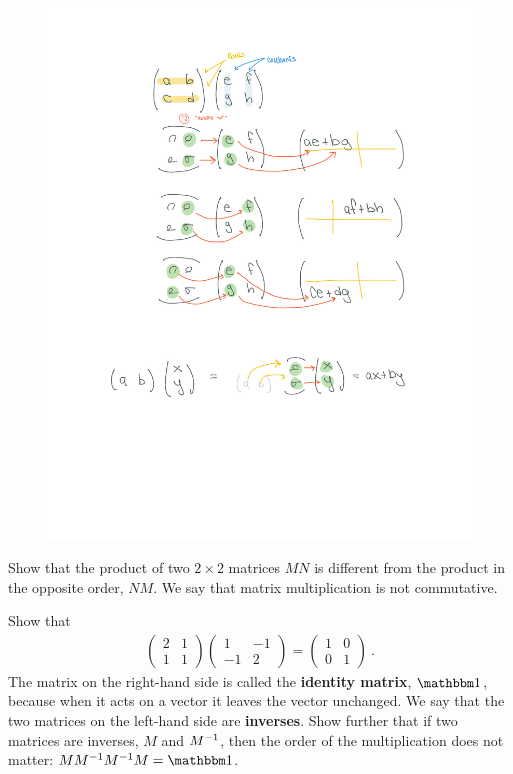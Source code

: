 \documentclass[12pt, oneside]{report}    %
\begin{document}
\begin{figure}[ht]
    \centering
    \includegraphics[width=.8\textwidth]{figures/MatrixMult_2222b.pdf}
\end{figure}
\begin{exercise}
Show that the product of two $2\times 2$ matrices $MN$ is different from the product in the opposite order, $NM$. We say that matrix multiplication is not commutative.  
\end{exercise}
\begin{exercise}
Show that
\begin{align}
\begin{pmatrix}
    2 & 1 \\
    1 & 1 
\end{pmatrix}
\begin{pmatrix}
    1 & -1 \\
    -1 & 2 
\end{pmatrix}
=
\begin{pmatrix}
    1 & 0 \\
    0 & 1
\end{pmatrix} \ .
\end{align}
The matrix on the right-hand side is called the \textbf{identity matrix}, $\one$, because when it acts on a vector it leaves the vector unchanged. We say that the two matrices on the left-hand side are \textbf{inverses}. Show further that if two matrices are inverses, $M$ and $M^{-1}$, then the order of the multiplication does not matter: $MM\inv M\inv M = \one$.
\end{exercise}
\end{document}
